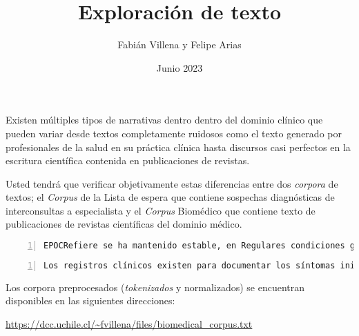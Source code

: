 \documentclass{article}
\title{Exploración de texto}
\author{Fabián Villena y Felipe Arias}
\date{Junio 2023}
\begin{document}
\maketitle

Existen múltiples tipos de narrativas dentro dentro del dominio clínico que pueden variar desde textos completamente ruidosos como el texto generado por profesionales de la salud en su práctica clínica hasta discursos casi perfectos en la escritura científica contenida en publicaciones de revistas.

Usted tendrá que verificar objetivamente estas diferencias entre dos \textit{corpora} de textos; el \textit{Corpus} de la Lista de espera que contiene sospechas diagnósticas de interconsultas a especialista y el \textit{Corpus} Biomédico que contiene texto de publicaciones de revistas científicas del dominio médico.

\noindent\begin{minipage}{.45\textwidth}
\begin{lstlisting}[breaklines=true, extendedchars=true,numbers=left,frame=single,caption=\textit{Corpus} de la lista de espera]
EPOCRefiere se ha mantenido estable, en Regulares condiciones generales, con aumento significativo en su disnea, ahora clase funcional III, sin angina u otros de alarma. Al examen: - BEG, normotensa, normocárdica, eupneica- RR2TSS- MP+ crepitos basales bilaterales- ABD: BDI, RHA+, sin masas palpables ni signos de irritacion peritoneal- Pulsos pedios  +/+, sin edema
\end{lstlisting}
\end{minipage}\hfill
\begin{minipage}{.45\textwidth}
	\begin{lstlisting}[breaklines=true, extendedchars=true,numbers=left,frame=single,caption=\textit{Corpus} Biomédico]
Los registros clínicos existen para documentar los síntomas iniciales del paciente, diagnósticos, medicamentos, tratamientos y resultados de estos tratamientos, teniendo además un carácter legal1. La información contenida en estos registros puede ser clasificada en estructurada y no estructurada.
	\end{lstlisting}
\end{minipage}

Los corpora preprocesados (\textit{tokenizados} y normalizados) se encuentran disponibles en las siguientes direcciones:

\begin{center}
	\url{https://dcc.uchile.cl/~fvillena/files/biomedical_corpus.txt}
\end{center}
\end{document}
